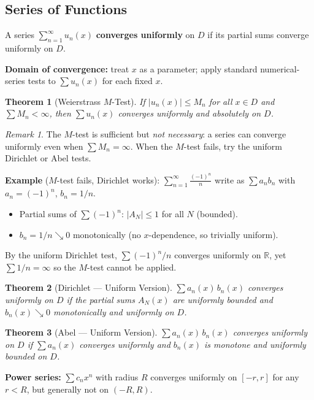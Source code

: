 \documentclass[12pt, a4paper]{article}
\newtheorem{theorem}{Theorem}[section]
\theoremstyle{definition}
\theoremstyle{remark}
\newtheorem*{remark}{Remark}
\begin{document}
\subsection{Series of Functions}

A series $\displaystyle\sum_{n=1}^\infty u_n(x)$ \textbf{converges uniformly} on $D$ if its partial sums converge uniformly on $D$.

\textbf{Domain of convergence:} treat $x$ as a parameter; apply standard numerical-series tests to $\sum u_n(x)$ for each fixed $x$.

\begin{theorem}[Weierstrass $M$-Test]
If $|u_n(x)| \leq M_n$ for all $x \in D$ and $\displaystyle\sum M_n < \infty$, then
$\sum u_n(x)$ converges uniformly and absolutely on $D$.
\end{theorem}

\begin{remark}
The $M$-test is sufficient but \emph{not necessary}: a series can converge uniformly even when $\sum M_n = \infty$.
When the $M$-test fails, try the uniform Dirichlet or Abel tests.

\textbf{Example} ($M$-test fails, Dirichlet works): $\displaystyle\sum_{n=1}^\infty \frac{(-1)^n}{n}$
write as $\sum a_n b_n$ with $a_n = (-1)^n$, $b_n = 1/n$.
\begin{itemize}
  \item Partial sums of $\sum(-1)^n$: $|A_N| \le 1$ for all $N$ \quad (bounded).
  \item $b_n = 1/n \searrow 0$ monotonically (no $x$-dependence, so trivially uniform).
\end{itemize}
By the uniform Dirichlet test, $\sum(-1)^n/n$ converges uniformly on $\mathbb{R}$,
yet $\sum 1/n = \infty$ so the $M$-test cannot be applied.
\end{remark}

\begin{theorem}[Dirichlet --- Uniform Version]
$\sum a_n(x)\,b_n(x)$ converges uniformly on $D$ if the partial sums $A_N(x)$ are uniformly bounded
and $b_n(x) \searrow 0$ monotonically and uniformly on $D$.
\end{theorem}

\begin{theorem}[Abel --- Uniform Version]
$\sum a_n(x)\,b_n(x)$ converges uniformly on $D$ if $\sum a_n(x)$ converges uniformly
and $b_n(x)$ is monotone and uniformly bounded on $D$.
\end{theorem}

\textbf{Power series:} $\displaystyle\sum c_n x^n$ with radius $R$ converges uniformly on $[-r,r]$ for any $r < R$,
but generally not on $(-R,R)$.
\end{document}
